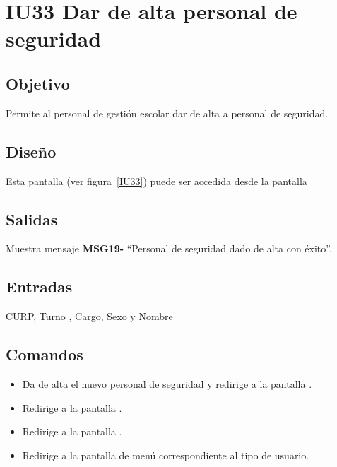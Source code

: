 
\section{IU33 Dar de alta personal de seguridad}
\subsection{Objetivo}
    Permite al personal de gestión escolar dar de alta a personal de seguridad.
\subsection{Diseño}
    Esta pantalla  (ver figura~\ref{IU33}) puede ser accedida desde la pantalla 

\subsection{Salidas}
Muestra mensaje {\bf MSG19-} ``Personal de seguridad dado de alta con éxito''.
\subsection{Entradas}
\hyperlink{Personal-de-seguridad.CURP }{CURP}, \hyperlink{personal-de-seguridad.Turno }{Turno }, \hyperlink{ Personal-de-seguridad.Cargo }{Cargo}, \hyperlink{ Personal-de-seguridad.Sexo}{Sexo} y \hyperlink{ Personal-de-seguridad.Nombre}{Nombre} 
\subsection{Comandos}
\begin{itemize}
    \item {} Da de alta el nuevo personal de seguridad y redirige a la pantalla .
    \item {} Redirige a la pantalla .
    \item {} Redirige a la pantalla .
    \item {} Redirige a la pantalla de menú correspondiente al tipo de usuario.
    
\end{itemize}

